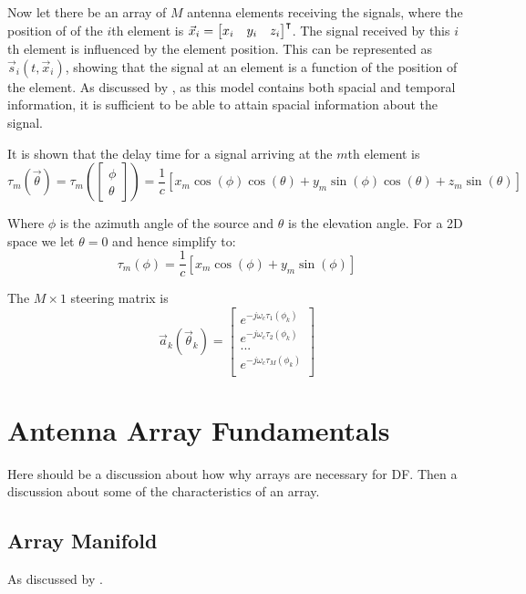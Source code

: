 Now let there be an array of $M$ antenna elements receiving the signals, where the position of of the \(i\)th element is \(\vec{x}_{i} = \begin{bmatrix}x_i & y_i & z_i \end{bmatrix}^\intercal\). 
The signal received by this \(i\)th element is influenced by the element position. 
This can be represented as \(\vec{s}_i(t, \vec{x}_i)\), showing that the signal at an element is a function of the position of the element.
As discussed by \cite{krim1996two}, as this model contains both spacial and temporal information, it is sufficient to be able to attain spacial information about the signal. 

It is shown that the delay time for a signal arriving at the \(m\)th element is
\begin{equation}
  \tau_m(\vec{\theta}) 
 = \tau_m( \begin{bmatrix} \phi \\ \theta \end{bmatrix} )
  = \frac{1}{c} [ x_m\cos(\phi)\cos(\theta) + y_m\sin(\phi)\cos(\theta) + z_m\sin(\theta) ]
\end{equation}

Where \(\phi\) is the azimuth angle of the source and \(\theta\) is the elevation angle.
For a 2D space we let \(\theta = 0\) and hence simplify to:
\begin{equation}
 \tau_m(\phi) = \frac{1}{c} [ x_m\cos(\phi) + y_m\sin(\phi) ]
\end{equation}

The \(M \times 1\) steering matrix is
\begin{equation}
  \vec{a}_k(\vec{\theta}_k) = 
  \begin{bmatrix}
    e^{-j\omega_c \tau_1(\phi_k)} \\
    e^{-j\omega_c \tau_2(\phi_k)} \\
    ... \\
    e^{-j\omega_c \tau_M(\phi_k)} \\
  \end{bmatrix}
\end{equation}

\section{Antenna Array Fundamentals}
Here should be a discussion about how why arrays are necessary for DF. Then a discussion about some of the characteristics of an array.
\subsection{Array Manifold}
As discussed by \cite{sleiman2000antenna} \cite{karimi1996manifold} \cite{dacos1995estimating}. 

